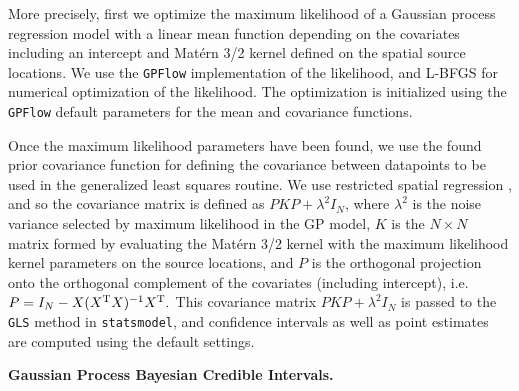 More precisely, first we optimize the maximum likelihood of a Gaussian process regression model with a linear mean function depending on the covariates including an intercept and Mat\'ern 3/2 kernel defined on the spatial source locations. We use the \texttt{GPFlow} \citep{GPflow2017} implementation of the likelihood, and L-BFGS \citep{liu_1989_lbfgs} for numerical optimization of the likelihood. The optimization is initialized using the \texttt{GPFlow} default parameters for the mean and covariance functions.

Once the maximum likelihood parameters have been found, we use the found prior covariance function for defining the covariance between datapoints to be used in the generalized least squares routine. We use restricted spatial regression \citep{hodges2010adding}, and so the covariance matrix is defined as $PKP + \lambda^2 I_N$, where $\lambda^2$ is the noise variance selected by maximum likelihood in the GP model, $K$ is the $N \times N$ matrix formed by evaluating the Mat\'ern 3/2 kernel with the maximum likelihood kernel parameters on the source locations, and $P$ is the orthogonal projection onto the orthogonal complement of the covariates (including intercept), i.e.
$
P = I_N - X(X^{\mathrm{T}}X)^{-1}X^{\mathrm{T}}.
$
This covariance matrix $PKP + \lambda^2 I_N$ is passed to the \texttt{GLS} method in \texttt{statsmodel}, and confidence intervals as well as point estimates are computed using the default settings. 

\textbf{Gaussian Process Bayesian Credible Intervals.}

